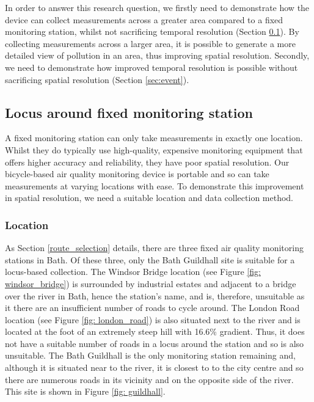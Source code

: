 \documentclass[11pt,twosided,a4paper]{report}
\begin{document}
In order to answer this research question, we firstly need to demonstrate how the device can collect measurements across a greater area compared to a fixed monitoring station, whilst not sacrificing temporal resolution (Section \ref{sec:locus}). By collecting measurements across a larger area, it is possible to generate a more detailed view of pollution in an area, thus improving spatial resolution. Secondly, we need to demonstrate how improved temporal resolution is possible without sacrificing spatial resolution (Section \ref{sec:event}). 

\subsection{Locus around fixed monitoring station} \label{sec:locus}

A fixed monitoring station can only take measurements in exactly one location. Whilst they do typically use high-quality, expensive monitoring equipment that offers higher accuracy and reliability, they have poor spatial resolution. Our bicycle-based air quality monitoring device is portable and so can take measurements at varying locations with ease. To demonstrate this improvement in spatial resolution, we need a suitable location and data collection method. 

\subsubsection{Location}

As Section \ref{route_selection} details, there are three fixed air quality monitoring stations in Bath. Of these three, only the Bath Guildhall site is suitable for a locus-based collection. The Windsor Bridge location (see Figure \ref{fig: windsor_bridge}) is surrounded by industrial estates and adjacent to a bridge over the river in Bath, hence the station's name, and is, therefore, unsuitable as it there are an insufficient number of roads to cycle around. The London Road location (see Figure \ref{fig: london_road}) is also situated next to the river and is located at the foot of an extremely steep hill with 16.6\% gradient. Thus, it does not have a suitable number of roads in a locus around the station and so is also unsuitable. The Bath Guildhall is the only monitoring station remaining and, although it is situated near to the river, it is closest to to the city centre and so there are numerous roads in its vicinity and on the opposite side of the river. This site is shown in Figure \ref{fig: guildhall}.
\end{document}
